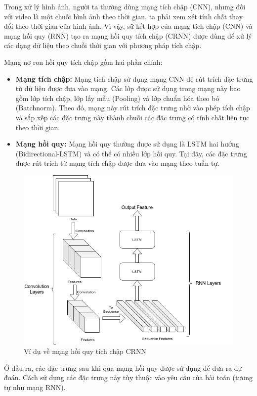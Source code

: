 Trong xử lý hình ảnh, người ta thường dùng mạng tích chập (CNN), nhưng đối với video là một chuỗi hình ảnh theo thời gian, ta phải xem xét tính chất thay đổi theo thời gian của hình ảnh. Vì vậy, sữ kết hợp của mạng tích chập (CNN) và mạng hồi quy (RNN) tạo ra mạng hồi quy tích chập (CRNN) được dùng để xử lý các dạng dữ liệu theo chuỗi thời gian với phương pháp tích chập.

Mạng nơ ron hồi quy tích chập gồm hai phần chính:
\begin{itemize}
    \item \textbf{Mạng tích chập:} Mạng tích chập sử dụng mạng CNN để rút trích đặc trưng từ dữ liệu được đưa vào mạng. Các lớp được sử dụng trong mạng này bao gồm lớp tích chập, lớp lấy mẫu (Pooling) và lớp chuẩn hóa theo bó (Batchnorm). Theo đó, mạng này rút trích đặc trưng nhờ vào phép tích chập và sắp xếp các đặc trưng này thành chuỗi các đặc trưng có tính chất liên tục theo thời gian.
    \item \textbf{Mạng hồi quy:} Mạng hồi quy thường được sử dụng là LSTM hai hướng (Bidirectional-LSTM) và có thể có nhiều lớp hồi quy. Tại đây, các đặc trưng được rút trích từ mạng tích chập được đưa vào mạng theo tuần tự.
\end{itemize}

\begin{figure}[H]
    \centering
    \includegraphics[width=13cm]{./content/materials/crnn.png}
    \caption{Ví dụ về mạng hồi quy tích chập CRNN}
\end{figure}

Ở đầu ra, các đặc trưng sau khi qua mạng hồi quy được sử dụng để đưa ra dự đoán. Cách sử dụng các đặc trưng này tùy thuộc vào yêu cầu của bài toán (tương tự như mạng RNN).

